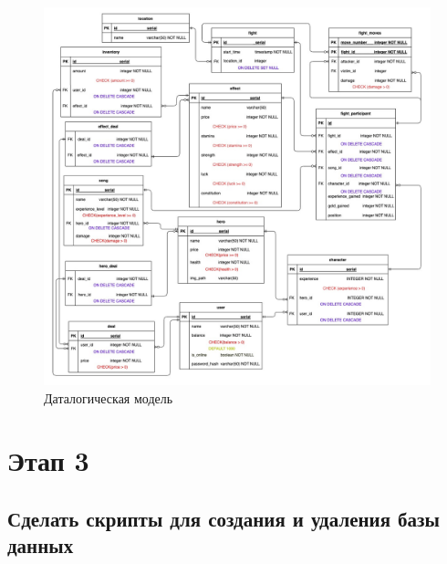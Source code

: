 \begin{figure}[H]
	\begin{center}
		\includegraphics[scale=0.44]{images/Datalogical.jpg}
		\caption{Даталогическая модель}
		\label{pic:pic_name} %
	\end{center}
\end{figure}

\newpage

\section*{Этап 3}


\subsection*{Сделать скрипты для создания и удаления базы данных}


